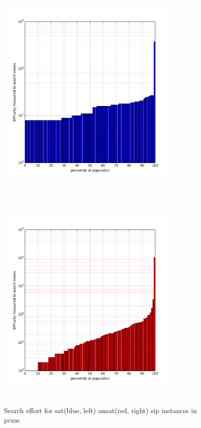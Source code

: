 \documentclass{l4proj}
\begin{document}
\begin{figure}
\centering
\begin{minipage}[t]{.5\textwidth}
  \centering
  \includegraphics[height=11cm,width=9cm]{images/plots/pcmsSAT.png}
\end{minipage}%
\begin{minipage}[t]{.5\textwidth}
  \centering
  \includegraphics[height=11cm,width=9cm]{images/plots/pcmsUNSAT.png}
\end{minipage}
\caption{Search effort for \gls{sat}(blue, left) \gls{unsat}(red, right) \gls{sip} instances in pcms}
\label{fig:pcmsSatUnsat}
\end{figure}
\end{document}
